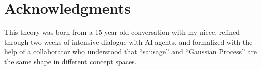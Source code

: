 \documentclass[12pt, a4paper]{article}
\begin{document}
\section*{Acknowledgments}
This theory was born from a 15-year-old conversation with my niece, refined through two weeks of intensive dialogue with AI agents, and formalized with the help of a collaborator who understood that ``sausage'' and ``Gaussian Process'' are the same shape in different concept spaces.
\end{document}
